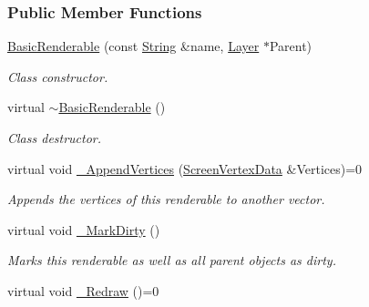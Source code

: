 \subsubsection*{Public Member Functions}
\begin{DoxyCompactItemize}
\item 
\hyperlink{classMezzanine_1_1UI_1_1BasicRenderable_a31cabdbf187a8e038079aa88af536c6f}{BasicRenderable} (const \hyperlink{namespaceMezzanine_acf9fcc130e6ebf08e3d8491aebcf1c86}{String} \&name, \hyperlink{classMezzanine_1_1UI_1_1Layer}{Layer} $\ast$Parent)
\begin{DoxyCompactList}\small\item\em Class constructor. \item\end{DoxyCompactList}\item 
\hypertarget{classMezzanine_1_1UI_1_1BasicRenderable_af7b5ef0dc231b3e233ad892ce4c89320}{
virtual \hyperlink{classMezzanine_1_1UI_1_1BasicRenderable_af7b5ef0dc231b3e233ad892ce4c89320}{$\sim$BasicRenderable} ()}
\label{classMezzanine_1_1UI_1_1BasicRenderable_af7b5ef0dc231b3e233ad892ce4c89320}

\begin{DoxyCompactList}\small\item\em Class destructor. \item\end{DoxyCompactList}\item 
virtual void \hyperlink{classMezzanine_1_1UI_1_1BasicRenderable_aafd3dd1e288791b1071cb8c043866504}{\_\-AppendVertices} (\hyperlink{classMezzanine_1_1UI_1_1ScreenVertexData}{ScreenVertexData} \&Vertices)=0
\begin{DoxyCompactList}\small\item\em Appends the vertices of this renderable to another vector. \item\end{DoxyCompactList}\item 
\hypertarget{classMezzanine_1_1UI_1_1BasicRenderable_a0b67567f462914b4de1caa4f0818d61d}{
virtual void \hyperlink{classMezzanine_1_1UI_1_1BasicRenderable_a0b67567f462914b4de1caa4f0818d61d}{\_\-MarkDirty} ()}
\label{classMezzanine_1_1UI_1_1BasicRenderable_a0b67567f462914b4de1caa4f0818d61d}

\begin{DoxyCompactList}\small\item\em Marks this renderable as well as all parent objects as dirty. \item\end{DoxyCompactList}\item 
\hypertarget{classMezzanine_1_1UI_1_1BasicRenderable_a2fc7dda5e44e8a8aca838864d67fde9b}{
virtual void \hyperlink{classMezzanine_1_1UI_1_1BasicRenderable_a2fc7dda5e44e8a8aca838864d67fde9b}{\_\-Redraw} ()=0}
\label{classMezzanine_1_1UI_1_1BasicRenderable_a2fc7dda5e44e8a8aca838864d67fde9b}


\end{DoxyCompactItemize}
